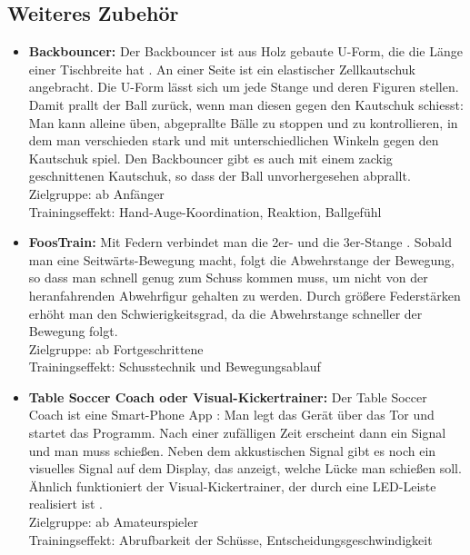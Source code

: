\subsection{Weiteres Zubehör}
\label{tisch:zubehoer:training:weiteres}

\begin{itemize}
\item {\bf Backbouncer:}
Der Backbouncer ist aus Holz gebaute U-Form, die die Länge einer Tischbreite hat \citep{www:kickertrainer}.
An einer Seite ist ein elastischer Zellkautschuk angebracht.
Die U-Form lässt sich um jede Stange und deren Figuren stellen. 
Damit prallt der Ball zurück, wenn man diesen gegen den Kautschuk schiesst: 
Man kann alleine üben, abgeprallte Bälle zu stoppen und zu kontrollieren, in dem man verschieden stark und mit unterschiedlichen Winkeln gegen den Kautschuk spiel. 
Den Backbouncer gibt es auch mit einem zackig geschnittenen Kautschuk, so dass der Ball unvorhergesehen abprallt.  
\\
Zielgruppe: ab Anfänger 
\\
Trainingseffekt: Hand-Auge-Koordination, Reaktion, Ballgefühl
\item {\bf FoosTrain:}
Mit Federn verbindet man die 2er- und die 3er-Stange \citep{www:foostrain}.
Sobald man eine Seitwärts-Bewegung macht, folgt die Abwehrstange der Bewegung, so dass man schnell genug zum Schuss kommen muss, um nicht von der heranfahrenden Abwehrfigur gehalten zu werden.
Durch größere Federstärken erhöht man den Schwierigkeitsgrad, da die Abwehrstange schneller der Bewegung folgt.
\\
Zielgruppe: ab Fortgeschrittene
\\
Trainingseffekt: Schusstechnik und Bewegungsablauf 
\item {\bf Table Soccer Coach oder Visual-Kickertrainer:}
Der Table Soccer Coach ist eine Smart-Phone App \citep{www:tablesoccercoach}:
Man legt das Gerät über das Tor und startet das Programm. 
Nach einer zufälligen Zeit erscheint dann ein Signal und man muss schießen.
Neben dem akkustischen Signal gibt es noch ein visuelles Signal auf dem Display, das anzeigt, welche Lücke man schießen soll.
Ähnlich funktioniert der Visual-Kickertrainer, der durch eine LED-Leiste realisiert ist \citep{www:visualkickertrainer}.
\\
Zielgruppe: ab Amateurspieler 
\\
Trainingseffekt: Abrufbarkeit der Schüsse, Entscheidungsgeschwindigkeit

\end{itemize}
